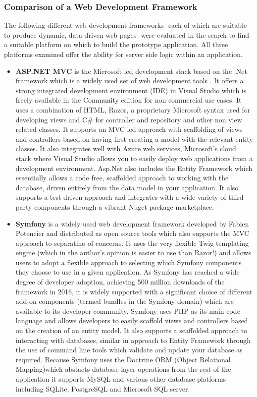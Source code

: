 \documentclass[a4paper,12pt]{article}
\begin{document}
\subsubsection{Comparison of a Web Development Framework}
The following different web development frameworks- each of which are suitable to produce dynamic, data driven web pages- were evaluated in the search to find a suitable platform on which to build the prototype application. All three platforms examined offer the ability for server side logic within an application.
\begin{itemize}
\item \textbf{ASP.NET MVC} is the Microsoft led development stack based on the .Net framework which is a widely used set of web development tools . It offers a strong integrated development environment (IDE) in Visual Studio which is freely available in the Community edition for non commercial use cases. It uses a combination of HTML, Razor, a proprietary Microsoft syntax used for developing views and C\# for controller and repository and other non view related classes. It supports an MVC led approach with  scaffolding of views and controllers based on having first creating a model with the relevant entity classes. It also integrates well with Azure web services, Microsoft's cloud stack where Visual Studio allows you to easily deploy web applications from a development environment. Asp.Net also includes the Entity Framework which essentially allows a code free, scaffolded approach to working with the database, driven entirely from the data model in your application. It also supports a test driven approach and integrates with a wide variety of third party components through a vibrant Nuget package marketplace.
\item \textbf{Symfony} is a widely used web development framework developed by Fabien Potencier and distributed as open source tools which also supports the MVC approach to separatino of concerns. It uses the very flexible Twig templating engine (which in the author's opinion is easier to use than Razor!) and allows users to adopt a flexible approach to selecting which Symfony components they choose to use in a given application. As Symfony has reached a wide degree of developer adoption, achieving 500 million downloads of the framework in 2016, it is widely supported with a significant choice of different add-on components (termed bundles in the Symfony domain) which are available to its developer community. Symfony uses PHP as its main code language and allows developers to easily scaffold views and controllers based on the creation of an entity model. It also supports a scaffolded approach to interacting with databases, similar in approach to Entity Framework through the use of command line tools which validate and update your database as required. Because Symfony uses the Doctrine ORM (Object Relational Mapping)which abstacts database layer operations from the rest of the application it supports MySQL and various other database platforms including SQLite, PostgreSQL and Microsoft SQL server.


\end{itemize}
\end{document}
